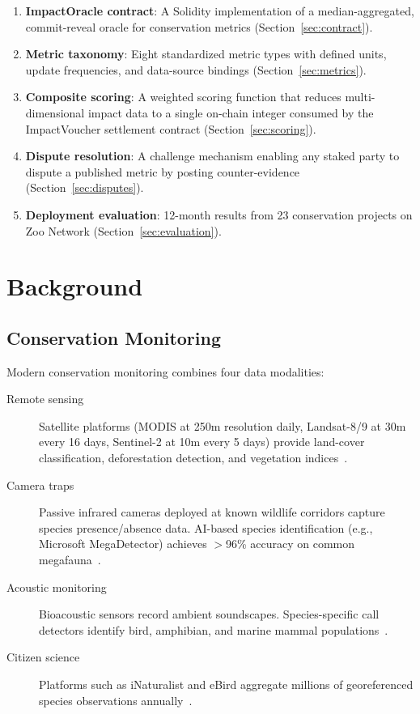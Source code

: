 \documentclass[11pt,letterpaper]{article}
\begin{document}
\begin{enumerate}
    \item \textbf{ImpactOracle contract}: A Solidity implementation of a median-aggregated, commit-reveal oracle for conservation metrics (Section~\ref{sec:contract}).
    \item \textbf{Metric taxonomy}: Eight standardized metric types with defined units, update frequencies, and data-source bindings (Section~\ref{sec:metrics}).
    \item \textbf{Composite scoring}: A weighted scoring function that reduces multi-dimensional impact data to a single on-chain integer consumed by the ImpactVoucher settlement contract (Section~\ref{sec:scoring}).
    \item \textbf{Dispute resolution}: A challenge mechanism enabling any staked party to dispute a published metric by posting counter-evidence (Section~\ref{sec:disputes}).
    \item \textbf{Deployment evaluation}: 12-month results from 23 conservation projects on Zoo Network (Section~\ref{sec:evaluation}).
\end{enumerate}

\section{Background}

\subsection{Conservation Monitoring}

Modern conservation monitoring combines four data modalities:

\begin{description}
    \item[Remote sensing] Satellite platforms (MODIS at 250m resolution daily, Landsat-8/9 at 30m every 16 days, Sentinel-2 at 10m every 5 days) provide land-cover classification, deforestation detection, and vegetation indices~\cite{hansen2013}.
    \item[Camera traps] Passive infrared cameras deployed at known wildlife corridors capture species presence/absence data. AI-based species identification (e.g., Microsoft MegaDetector) achieves $>$96\% accuracy on common megafauna~\cite{beery2019}.
    \item[Acoustic monitoring] Bioacoustic sensors record ambient soundscapes. Species-specific call detectors identify bird, amphibian, and marine mammal populations~\cite{gibb2019}.
    \item[Citizen science] Platforms such as iNaturalist and eBird aggregate millions of georeferenced species observations annually~\cite{sullivan2014}.
\end{description}
\end{document}
